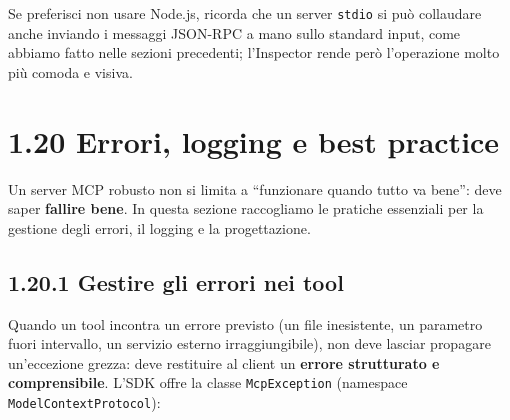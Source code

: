 \documentclass[
  italian,
  10pt,
]{book}
\newenvironment{Shaded}{\begin{snugshade}}{\end{snugshade}}
\newcommand{\DataTypeTok}[1]{\textcolor[rgb]{0.13,0.29,0.53}{#1}}
\newcommand{\FunctionTok}[1]{\textcolor[rgb]{0.13,0.29,0.53}{\textbf{#1}}}
\newcommand{\KeywordTok}[1]{\textcolor[rgb]{0.13,0.29,0.53}{\textbf{#1}}}
\newcommand{\NormalTok}[1]{#1}
\newcommand{\OperatorTok}[1]{\textcolor[rgb]{0.81,0.36,0.00}{\textbf{#1}}}
\newcommand{\StringTok}[1]{\textcolor[rgb]{0.31,0.60,0.02}{#1}}
\begin{document}
Se preferisci non usare Node.js, ricorda che un server \texttt{stdio} si
può collaudare anche inviando i messaggi JSON-RPC a mano sullo standard
input, come abbiamo fatto nelle sezioni precedenti; l'Inspector rende
però l'operazione molto più comoda e visiva.

\section{1.20 Errori, logging e best
practice}\label{errori-logging-e-best-practice}

Un server MCP robusto non si limita a ``funzionare quando tutto va
bene'': deve saper \textbf{fallire bene}. In questa sezione raccogliamo
le pratiche essenziali per la gestione degli errori, il logging e la
progettazione.

\subsection{1.20.1 Gestire gli errori nei
tool}\label{gestire-gli-errori-nei-tool}

Quando un tool incontra un errore previsto (un file inesistente, un
parametro fuori intervallo, un servizio esterno irraggiungibile), non
deve lasciar propagare un'eccezione grezza: deve restituire al client un
\textbf{errore strutturato e comprensibile}. L'SDK offre la classe
\texttt{McpException} (namespace \texttt{ModelContextProtocol}):

\begin{Shaded}
\end{Shaded}
\end{document}
